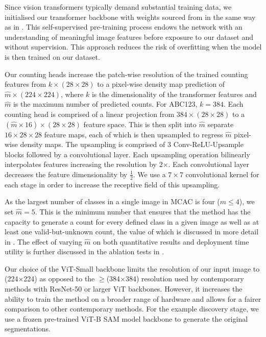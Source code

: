 \documentclass[../thesis.tex]{subfiles}
\begin{document}
Since vision transformers typically demand substantial training data, we initialised our transformer backbone with weights sourced from \citet{caron2021DINO} in the same way as in .
This self-supervised pre-training process endows the network with an understanding of meaningful image features before exposure to our dataset and without supervision. This approach reduces the risk of overfitting when the model is then trained on our dataset.

Our counting heads increase the patch-wise resolution of the trained counting features from $k \times (28\times28)$ to a pixel-wise density map prediction of $\hat{m} \times (224\times224)$,
where $k$ is the dimensionality of the transformer features and $\hat{m}$ is the maximum number of predicted counts. For ABC123, $k = 384$.
Each counting head is comprised of  a linear projection from $384\times(28\times28)$ to a $(\hat{m}\times16)\times(28\times28)$ feature space.
This is then split into $\hat{m}$ separate $16\times28\times28$ feature maps, each of which is then upsampled to regress $\hat{m}$ pixel-wise density maps. 
The upsampling is comprised of 3 Conv-ReLU-Upsample blocks followed by a convolutional layer. Each upsampling operation bilinearly interpolates features increasing the resolution by 2$\times$. Each convolutional layer decreases the feature dimensionality by $\frac{1}{2}$. We use a $7\times7$ convolutional kernel for each stage in order to increase the receptive field of this upsampling. 

As the largest number of classes in a single image in MCAC is four ($m\leq4$), we set $\hat{m} = 5$. This is the minimum number that ensures that the method has the capacity to generate a count for every defined class in a given image as well as at least one valid-but-unknown count, the value of which is discussed in more detail in . The effect of varying $\hat{m}$ on both quantitative results and deployment time utility is further discussed in the ablation tests in  .

Our choice of the ViT-Small backbone limits the resolution of our input image to (224$\times$224) as opposed to the $\geq$(384$\times$384) resolution used by contemporary methods with ResNet-50 or larger ViT backbones. However, it increases the ability to train the method on a broader range of hardware and allows for a fairer comparison to other contemporary methods.
For the example discovery stage, we use a frozen pre-trained ViT-B SAM model backbone \cite{kirillov2023segany} to generate the original segmentations. 
\end{document}
